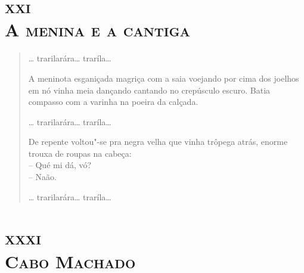 \chapter[\textsc{xxi} -- \textsc{A menina e a cantiga}]{\textsc{xxi}\\\textsc{A menina e a cantiga}}


\begin{verse}
\ldots{} trarilarára\ldots{} traríla\ldots{}

A meninota esganiçada magriça com a saia voejando por cima dos joelhos
em nó vinha meia dançando cantando no crepúsculo escuro. Batia compasso
com a varinha na poeira da calçada.

\ldots{} trarilarára\ldots{} traríla\ldots{}

De repente voltou"-se pra negra velha que vinha trôpega atrás, enorme
trouxa de roupas na cabeça:\\
-- Qué mi dá, vó?\\
-- Naão.

\ldots{} trarilarára\ldots{} traríla\ldots{}
\end{verse}

\chapter[\textsc{xxxi} -- \textsc{Cabo Machado}]{\textsc{xxxi}\\\textsc{Cabo Machado}}

